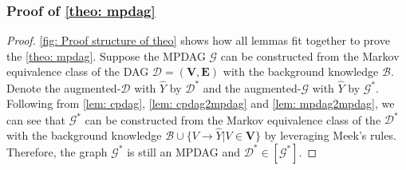 \documentclass{article} %
\begin{document}


\subsubsection{Proof of \cref{theo: mpdag}}  \label{proof_theo: mpdag}
\begin{proof}
    \cref{fig: Proof structure of theo} shows how all lemmas fit together to prove the \cref{theo: mpdag}. 
    Suppose the MPDAG $\mathcal{G}$ can be constructed from the Markov equivalence class of the DAG $\mathcal{D}=(\mathbf{V}, \mathbf{E})$ with the background knowledge $\mathcal{B}$. Denote the augmented-$\mathcal{D}$ with $\hat{Y}$ by $\mathcal{D^*}$ and the augmented-$\mathcal{G}$ with $\hat{Y}$ by $\mathcal{G^*}$. Following from \cref{lem: cpdag}, \cref{lem: cpdag2mpdag} and \cref{lem: mpdag2mpdag}, we can see that $\mathcal{G^*}$ can be constructed from the Markov equivalence class of the $\mathcal{D^*}$ with the background knowledge $\mathcal{B} \cup \{V \rightarrow \hat{Y}|V \in \mathbf{V}\}$ by leveraging Meek's rules. Therefore, the graph $\mathcal{G^*}$ is still an MPDAG and $\mathcal{D^*} \in [\mathcal{G^*}]$.
\end{proof}
\end{document}
